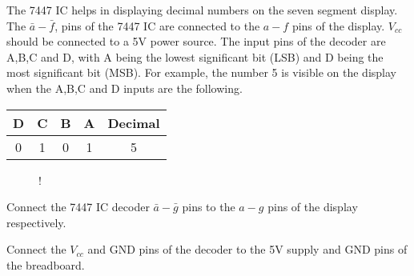 %
The 7447 IC helps in displaying decimal numbers on the seven segment display.  The $\bar{a}-\bar{f}$, pins of the 7447 IC are connected to the $a-f$ pins of the display. $V_{cc}$ should be connected to a 5V power source. The input pins of the decoder are A,B,C and D, with A being the lowest significant bit (LSB) and D being the most significant bit (MSB).  For example, the number 5 is visible on the display when the A,B,C and D inputs are the following.
\begin{center}
	\begin{tabular}{|c|c|c|c|c|}
\hline
D & C & B & A & Decimal
\\ \hline
0 & 1 & 0 & 1 & 5
\\
\hline
\end{tabular}
\end{center}
%
\begin{figure}[!h]
\begin{center}
\resizebox {\columnwidth} {!} {

}
\end{center}
\caption{}
\label{fig:7447}
\end{figure}



%
\begin{problem}
	Connect the 7447 IC decoder $\bar{a}-\bar{g}$ pins to the $a-g$ pins of the display respectively.
\end{problem}
\begin{problem}
	Connect the $V_{cc}$ and GND pins of the decoder to the 5V supply and GND pins of the breadboard.
\end{problem}

